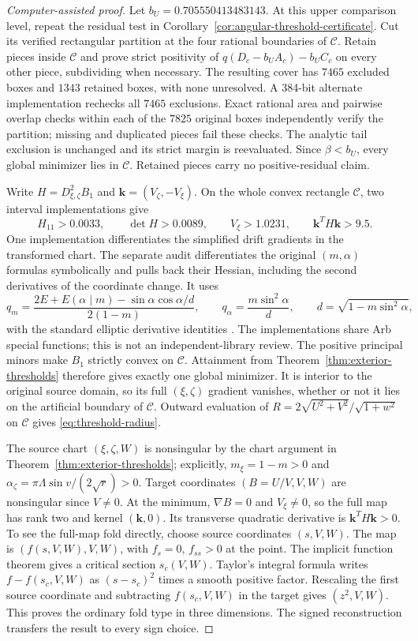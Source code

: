 \documentclass[11pt,a4paper]{article}
\theoremstyle{remark}\newtheorem{remark}[theorem]{Remark}
\begin{document}
\begin{proof}[Computer-assisted proof]
Let $b_U=0.705550413483143$. At this upper comparison level, repeat
the residual test in Corollary~\ref{cor:angular-threshold-certificate}.
Cut its verified rectangular partition at the four rational boundaries
of $\mathcal C$. Retain pieces inside $\mathcal C$ and prove strict
positivity of $q(D_c-b_U A_c)-b_U C_c$ on every other piece, subdividing
when necessary. The resulting cover has $7465$ excluded boxes and
$1343$ retained boxes, with none unresolved. A 384-bit alternate
implementation rechecks all $7465$ exclusions. Exact rational area
and pairwise overlap checks within each of the $7825$ original boxes
independently verify the partition; missing and duplicated pieces fail
these checks. The analytic tail exclusion is unchanged and its strict
margin is reevaluated. Since $\beta<b_U$, every global minimizer lies
in $\mathcal C$. Retained pieces carry no positive-residual claim.

Write $H=D^2_{\xi,\zeta}B_1$ and
$\mathbf k=(V_\zeta,-V_\xi)$. On the whole convex rectangle
$\mathcal C$, two interval implementations give
\[
 H_{11}>0.0033,\qquad \det H>0.0089,\qquad
 V_\xi>1.0231,\qquad \mathbf k^TH\mathbf k>9.5.
\]
One implementation differentiates the simplified drift gradients in
the transformed chart. The separate audit differentiates the original
$(m,\alpha)$ formulas symbolically and pulls back their Hessian,
including the second derivatives of the coordinate change. It uses
\[
 q_m=\frac{2E+E(\alpha\mid m)-\sin\alpha\cos\alpha/d}{2(1-m)},
 \qquad q_\alpha=\frac{m\sin^2\alpha}{d},
 \qquad d=\sqrt{1-m\sin^2\alpha},
\]
with the standard elliptic derivative identities
\cite[Section 19.4]{DLMF}. The implementations share Arb special
functions; this is not an independent-library review.
The positive principal minors make $B_1$ strictly convex on
$\mathcal C$. Attainment from Theorem~\ref{thm:exterior-thresholds}
therefore gives exactly one global minimizer. It is interior to the
original source domain, so its full $(\xi,\zeta)$ gradient vanishes,
whether or not it lies on the artificial boundary of $\mathcal C$.
Outward evaluation of $R=2\sqrt{U^2+V^2}/\sqrt{1+w^2}$ on
$\mathcal C$ gives \eqref{eq:threshold-radius}.

The source chart $(\xi,\zeta,W)$ is nonsingular by the chart argument
in Theorem~\ref{thm:exterior-thresholds}; explicitly,
$m_\xi=1-m>0$ and
$\alpha_\zeta=\pi\Lambda\sin v/(2\sqrt r)>0$.
Target coordinates $(B=U/V,V,W)$ are nonsingular since $V\ne0$.
At the minimum, $\nabla B=0$ and $V_\xi\ne0$, so the full map
has rank two and kernel $(\mathbf k,0)$. Its transverse quadratic
derivative is $\mathbf k^TH\mathbf k>0$.
To see the full-map fold directly, choose source coordinates $(s,V,W)$.
The map is $(f(s,V,W),V,W)$, with $f_s=0$, $f_{ss}>0$ at the point.
The implicit function theorem gives a critical section $s_c(V,W)$.
Taylor's integral formula writes $f-f(s_c,V,W)$ as $(s-s_c)^2$
times a smooth positive factor. Rescaling the first source coordinate
and subtracting $f(s_c,V,W)$ in the target gives $(z^2,V,W)$.
This proves the ordinary fold type in three dimensions.
The signed reconstruction transfers the result to every sign choice.


\end{proof}
\end{document}
